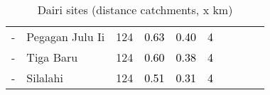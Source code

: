\begin{table}[ht]
\begin{tabular}{C{0.05\textwidth}C{0.15\textwidth}C{0.08\textwidth}C{0.08\textwidth}C{0.08\textwidth}C{0.08\textwidth}C{0.08\textwidth}C{0.08\textwidth}C{0.08\textwidth}C{0.08\textwidth}}
  {-} & Pegagan Julu Ii & 124 & \textcolor[HTML]{000000}{0.63} & \textcolor[HTML]{000000}{0.40} & \textcolor[HTML]{000000}{4} &  &  &  &  \\ 
  {-} & Tiga Baru & 124 & \textcolor[HTML]{000000}{0.60} & \textcolor[HTML]{000000}{0.38} & \textcolor[HTML]{000000}{4} &  &  &  &  \\ 
  {-} & Silalahi & 124 & \textcolor[HTML]{000000}{0.51} & \textcolor[HTML]{000000}{0.31} & \textcolor[HTML]{000000}{4} &  &  &  &  \\ 
  \end{tabular}
\endgroup
\caption{Dairi sites (distance catchments, x km)} 
\label{tab:dairi_dist}
\end{table}
